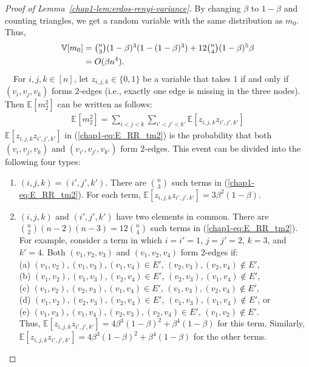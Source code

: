 {\begin{proof}[Proof of Lemma~\ref{chap1-lem:erdos-renyi-variance}]
By changing $\beta$ to $1-\beta$ and counting triangles, we get a random variable with the same distribution as $m_0$. Thus,
\begin{align*}
  \mathbb{V}[m_0] 
  &= \textstyle{\binom{n}{3} (1-\beta)^3(1-(1-\beta)^3) + 12\binom{n}{4} (1-\beta)^5\beta}
  \\
  &= O(\beta n^4).
\end{align*}
\smallskip
{}~~For $i,j,k \in [n]$, let $z_{i,j,k} \in \{0,1\}$ be a variable that takes $1$ if and only if 
$(v_i, v_j, v_k)$ forms $2$-edges (i.e., exactly one edge is missing in the three nodes). 
Then $\mathbb{E}[m_2^2]$ can be written as follows:
\begin{align}
  \mathbb{E}[m_2^2] = \sum_{i<j<k} \sum_{i'<j'<k'}
  \mathbb{E}[z_{i,j,k} z_{i',j',k'}] 
  \label{chap1-eq:E_RR_tm2}
\end{align}
$\mathbb{E}[z_{i,j,k} z_{i',j',k'}]$ in (\ref{chap1-eq:E_RR_tm2}) is the probability that both $(v_i,v_j,v_k)$ and $(v_{i'},v_{j'},v_{k'})$ form $2$-edges. 
This event can be divided into the following four types:
\begin{enumerate}
	\item $(i,j,k)=(i',j',k')$. There are $\binom{n}{3}$ such terms in (\ref{chap1-eq:E_RR_tm2}). 
    For each term, $\mathbb{E}[z_{i,j,k} z_{i',j',k'}]=3\beta^2(1-\beta)$. 
	\item $(i,j,k)$ and $(i',j',k')$ have two elements in common. 
	There are $\binom{n}{2}(n-2)(n-3) = 12 \binom{n}{4}$ such terms in (\ref{chap1-eq:E_RR_tm2}). 
	For example, consider a term in which $i=i'=1$, $j=j'=2$, $k=3$, and $k'=4$. 
	Both $(v_1,v_2,v_3)$ and $(v_1,v_2,v_4)$ form 2-edges if:\\
	(a) $(v_1,v_2), (v_1,v_3), (v_1,v_4) \in E'$, $(v_2,v_3), (v_2,v_4) \notin E'$, \\
	(b) $(v_1,v_2), (v_1,v_3), (v_2,v_4) \in E'$, $(v_2,v_3), (v_1,v_4) \notin E'$, \\
	(c) $(v_1,v_2), (v_2,v_3), (v_1,v_4) \in E'$, $(v_1,v_3), (v_2,v_4) \notin E'$, \\
	(d) $(v_1,v_2), (v_2,v_3), (v_2,v_4) \in E'$, $(v_1,v_3), (v_1,v_4) \notin E'$, or \\
	(e) $(v_1,v_3), (v_1,v_4), (v_2,v_3), (v_2,v_4) \in E'$, $(v_1,v_2) \notin E'$. \\
    Thus, $\mathbb{E}[z_{i,j,k} z_{i',j',k'}]=4\beta^3(1-\beta)^2 + \beta^4(1-\beta)$ for this term. 
    Similarly, $\mathbb{E}[z_{i,j,k} z_{i',j',k'}]=4\beta^3(1-\beta)^2 + \beta^4(1-\beta)$ for the other terms.

\end{enumerate}
\end{proof}}
